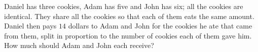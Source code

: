 Daniel has three cookies, Adam has five and John has six; all the cookies are identical. They share all the cookies so that each of them eats the same amount. Daniel then pays $14$ dollars to Adam and John for the cookies he ate that came from them, split in proportion to the number of cookies each of them gave him. How much should Adam and John each receive?
